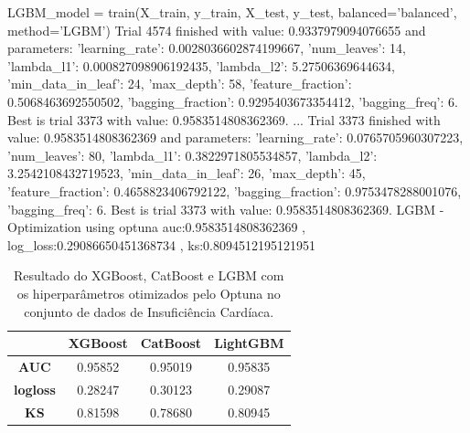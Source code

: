 \begin{codigo}[caption={Resultado do Optuna no conjunto de dados de Insuficiência Cardíaca.}, label={codigo:res:op:dia}, language=Python, breaklines=true]
LGBM_model = train(X_train, y_train, X_test, y_test, balanced='balanced', method='LGBM')
Trial 4574 finished with value: 0.9337979094076655 and parameters: {'learning_rate': 0.0028036602874199667, 'num_leaves': 14, 'lambda_l1': 0.000827098906192435, 'lambda_l2': 5.27506369644634, 'min_data_in_leaf': 24, 'max_depth': 58, 'feature_fraction': 0.5068463692550502, 'bagging_fraction': 0.9295403673354412, 'bagging_freq': 6}. Best is trial 3373 with value: 0.9583514808362369.
...
Trial 3373 finished with value: 0.9583514808362369 and parameters: {'learning_rate': 0.0765705960307223, 'num_leaves': 80, 'lambda_l1': 0.3822971805534857, 'lambda_l2': 3.2542108432719523, 'min_data_in_leaf': 26, 'max_depth': 45, 'feature_fraction': 0.4658823406792122, 'bagging_fraction': 0.9753478288001076, 'bagging_freq': 6}. Best is trial 3373 with value: 0.9583514808362369.
LGBM - Optimization using optuna
auc:0.9583514808362369 , log_loss:0.29086650451368734 , ks:0.8094512195121951
\end{codigo}

\begin{table}[H]
\centering
\begin{tabular}{|c|c|c|c|}
\hline
	& \textbf{XGBoost} &\textbf{CatBoost} & \textbf{LightGBM} \\
\hline
\textbf{AUC}	& 0.95852	&0.95019	&0.95835\\
\hline
\textbf{logloss}	& 0.28247	&0.30123	&0.29087\\
\hline
\textbf{KS}	&0.81598	&0.78680 &0.80945\\
\hline
\end{tabular}
\caption{Resultado do XGBoost, CatBoost e LGBM com os hiperparâmetros otimizados pelo Optuna no conjunto de dados de Insuficiência Cardíaca.}\label{res:car:op}
\end{table}
